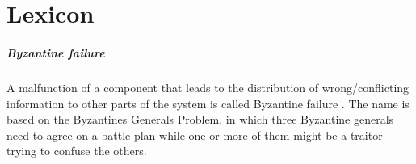 
\cleardoublepage
\chapter{Lexicon}
\label{app:dic}

\paragraph*{Byzantine failure} A malfunction of a component that leads to the distribution of wrong/conflicting information to other parts of the system is called Byzantine failure \cite{lamport1982byzantine}. The name is based on the Byzantines Generals Problem, in which three Byzantine generals need to agree on a battle plan while one or more of them might be a traitor trying to confuse the others.
